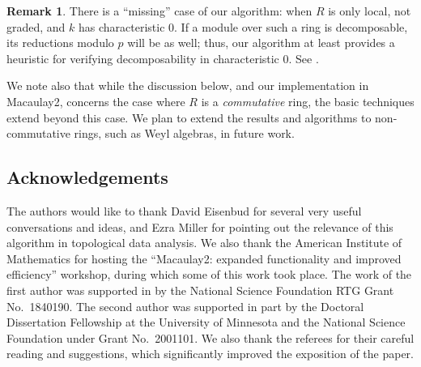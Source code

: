 \documentclass[12pt]{article}
\theoremstyle{theorem}
\numberwithin{thm}{section}
\theoremstyle{definition}
\newtheorem{rem}[thm]{Remark}
\begin{document}
\begin{rem}
  There is a ``missing'' case of our algorithm: when $R$ is only local, not graded, and $k$ has characteristic 0. If a module over such a ring is decomposable, its reductions modulo $p$ will be as well; thus, our algorithm at least provides a heuristic for verifying decomposability in characteristic 0. See .

  We note also that while the discussion below, and our implementation in Macaulay2, concerns the case where $R$ is a \emph{commutative} ring, the basic techniques extend beyond this case. We plan to extend the results and algorithms to non-commutative rings, such as Weyl algebras, in future work.
\end{rem}

\subsection*{Acknowledgements}

The authors would like to thank David Eisenbud for several very useful conversations and ideas, and Ezra Miller for pointing out the relevance of this algorithm in topological data analysis.
We also thank the American Institute of Mathematics for hosting the ``Macaulay2: expanded functionality and improved efficiency'' workshop, during which some of this work took place.
The work of the first author was supported in by the National Science Foundation RTG Grant No.~1840190.
The second author was supported in part by the Doctoral Dissertation Fellowship at the University of Minnesota and the National Science Foundation under Grant No.~2001101.
We also thank the referees for their careful reading and suggestions, which significantly improved the exposition of the paper.
\end{document}
